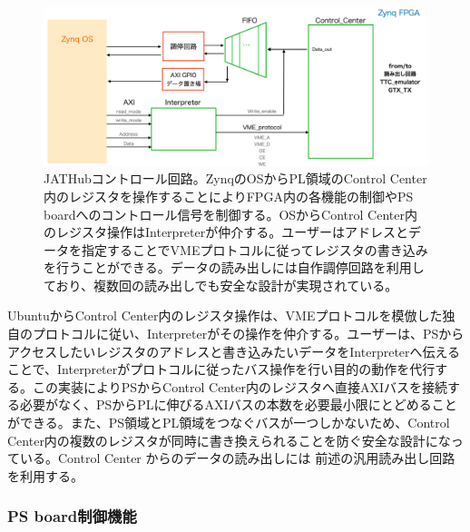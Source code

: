 \begin{figure} 
\centering
\includegraphics[width=16cm]{fig/QAQC/JATHubccenter.png}
\caption[JATHubコントロール回路]{JATHubコントロール回路。ZynqのOSからPL領域のControl Center内のレジスタを操作することによりFPGA内の各機能の制御やPS boardへのコントロール信号を制御する。OSからControl Center内のレジスタ操作はInterpreterが仲介する。ユーザーはアドレスとデータを指定することでVMEプロトコルに従ってレジスタの書き込みを行うことができる。データの読み出しには自作調停回路を利用しており、複数回の読み出しでも安全な設計が実現されている。}
\label{JATHubccenter}
\end{figure}

UbuntuからControl Center内のレジスタ操作は、VMEプロトコルを模倣した独自のプロトコルに従い、Interpreterがその操作を仲介する。ユーザーは、PSからアクセスしたいレジスタのアドレスと書き込みたいデータをInterpreterへ伝えることで、Interpreterがプロトコルに従ったバス操作を行い目的の動作を代行する。この実装によりPSからControl Center内のレジスタへ直接AXIバスを接続する必要がなく、PSからPLに伸びるAXIバスの本数を必要最小限にとどめることができる。また、PS領域とPL領域をつなぐバスが一つしかないため、Control Center内の複数のレジスタが同時に書き換えられることを防ぐ安全な設計になっている。Control Center からのデータの読み出しには 前述の汎用読み出し回路を利用する。

\subsubsection{PS board制御機能}

